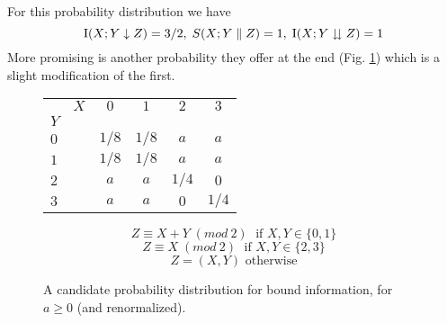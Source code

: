 		For this probability distribution we have
	$$ \operatorname{I}(X;Y\downarrow Z) = 3/2 ,\; S(X;Y\parallel Z) = 1 , \; \operatorname{I}(X;Y\downdownarrows Z) = 1 $$
	More promising is another probability they offer at the end (Fig. \ref{Tab:candidate2}) which is a slight modification of the first.
	
	
	\begin{figure}
		\begin{center}
		\begin{tabular}{|l r||c|c|c|c|}
		    \hline 
		    		 &	$X$ & $0$ & $1$ & $2$ & $3$ \\ 
		    $Y$ &		  &		&			&			&		\\
		    \hline 
		    \hline
		    $0$ &		   & $1/8$ & $1/8$ & $a$ & $a$ \\ 
		    \hline 
		    $1$ &		   & $1/8$ & $1/8$ & $a$ & $a$ \\ 
		    \hline 
		    $2$ &		   & $a$ & $a$ & $1/4$ & $0$ \\ 
		    \hline 
		    $3$ &		   & $a$ & $a$ & $0$ & $1/4$ \\ 
		    \hline 
		  \end{tabular} 
	\end{center}
	
			$$Z \equiv X + Y\; (mod\: 2)\; \text{ if } X,Y \in \{ 0,1\}$$ 
	    	$$Z \equiv X\; (mod\: 2)\; \text{ if } X,Y \in \{ 2,3\}$$ 
	    	$$Z = (X,Y) \text{ otherwise} $$
	    	
	    	\caption{A candidate probability distribution for bound information, for $a\geq 0$ (and renormalized).}
	    	\label{Tab:candidate2}
	\end{figure}
    